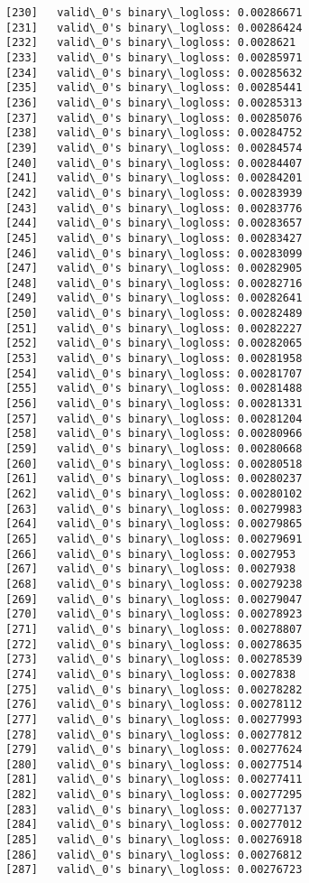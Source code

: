\documentclass[11pt]{article}
\begin{document}
\begin{Verbatim}[commandchars=\\\{\}]
[230]	valid\_0's binary\_logloss: 0.00286671
[231]	valid\_0's binary\_logloss: 0.00286424
[232]	valid\_0's binary\_logloss: 0.0028621
[233]	valid\_0's binary\_logloss: 0.00285971
[234]	valid\_0's binary\_logloss: 0.00285632
[235]	valid\_0's binary\_logloss: 0.00285441
[236]	valid\_0's binary\_logloss: 0.00285313
[237]	valid\_0's binary\_logloss: 0.00285076
[238]	valid\_0's binary\_logloss: 0.00284752
[239]	valid\_0's binary\_logloss: 0.00284574
[240]	valid\_0's binary\_logloss: 0.00284407
[241]	valid\_0's binary\_logloss: 0.00284201
[242]	valid\_0's binary\_logloss: 0.00283939
[243]	valid\_0's binary\_logloss: 0.00283776
[244]	valid\_0's binary\_logloss: 0.00283657
[245]	valid\_0's binary\_logloss: 0.00283427
[246]	valid\_0's binary\_logloss: 0.00283099
[247]	valid\_0's binary\_logloss: 0.00282905
[248]	valid\_0's binary\_logloss: 0.00282716
[249]	valid\_0's binary\_logloss: 0.00282641
[250]	valid\_0's binary\_logloss: 0.00282489
[251]	valid\_0's binary\_logloss: 0.00282227
[252]	valid\_0's binary\_logloss: 0.00282065
[253]	valid\_0's binary\_logloss: 0.00281958
[254]	valid\_0's binary\_logloss: 0.00281707
[255]	valid\_0's binary\_logloss: 0.00281488
[256]	valid\_0's binary\_logloss: 0.00281331
[257]	valid\_0's binary\_logloss: 0.00281204
[258]	valid\_0's binary\_logloss: 0.00280966
[259]	valid\_0's binary\_logloss: 0.00280668
[260]	valid\_0's binary\_logloss: 0.00280518
[261]	valid\_0's binary\_logloss: 0.00280237
[262]	valid\_0's binary\_logloss: 0.00280102
[263]	valid\_0's binary\_logloss: 0.00279983
[264]	valid\_0's binary\_logloss: 0.00279865
[265]	valid\_0's binary\_logloss: 0.00279691
[266]	valid\_0's binary\_logloss: 0.0027953
[267]	valid\_0's binary\_logloss: 0.0027938
[268]	valid\_0's binary\_logloss: 0.00279238
[269]	valid\_0's binary\_logloss: 0.00279047
[270]	valid\_0's binary\_logloss: 0.00278923
[271]	valid\_0's binary\_logloss: 0.00278807
[272]	valid\_0's binary\_logloss: 0.00278635
[273]	valid\_0's binary\_logloss: 0.00278539
[274]	valid\_0's binary\_logloss: 0.0027838
[275]	valid\_0's binary\_logloss: 0.00278282
[276]	valid\_0's binary\_logloss: 0.00278112
[277]	valid\_0's binary\_logloss: 0.00277993
[278]	valid\_0's binary\_logloss: 0.00277812
[279]	valid\_0's binary\_logloss: 0.00277624
[280]	valid\_0's binary\_logloss: 0.00277514
[281]	valid\_0's binary\_logloss: 0.00277411
[282]	valid\_0's binary\_logloss: 0.00277295
[283]	valid\_0's binary\_logloss: 0.00277137
[284]	valid\_0's binary\_logloss: 0.00277012
[285]	valid\_0's binary\_logloss: 0.00276918
[286]	valid\_0's binary\_logloss: 0.00276812
[287]	valid\_0's binary\_logloss: 0.00276723

\end{Verbatim}
\end{document}
